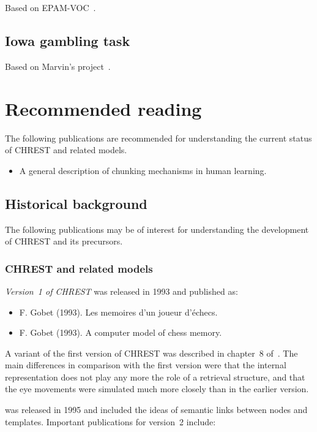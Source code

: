\documentclass{article}
\begin{document}
Based on EPAM-VOC~\cite{Jones08}.

\subsection{Iowa gambling task}

Based on Marvin's project~\cite{Gobet11a}.

\section{Recommended reading}

The following publications are recommended for understanding the current 
status of CHREST and related models.

\begin{itemize}
\item A general description of chunking mechanisms in human learning.\cite{Gobet01}
\end{itemize}


\subsection{Historical background}

The following publications may be of interest for understanding the development 
of CHREST and its precursors.

\subsubsection{CHREST and related models}

{\em Version~1 of CHREST} was released in 1993 and published as:

\begin{itemize}
\item F. Gobet (1993). Les memoires d'un joueur d'\'echecs.~\cite{Gobet93a}
\item F. Gobet (1993). A computer model of chess memory.~\cite{Gobet93b}
\end{itemize}

A variant of the first version of CHREST was described in chapter~8 of~\cite{deGroot96}.
The main differences in comparison with the first version were that the
internal representation does not play any more the role of a retrieval
structure, and that the eye movements were simulated much more closely than in
the earlier version. 
\vspace{3pt}

 was released in 1995 and included the
ideas of semantic links between nodes and templates.  Important publications
for version~2 include:
\end{document}
